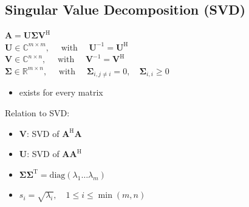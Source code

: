 \documentclass[english]{latex4ei/latex4ei_sheet}
\begin{document}
\begin{sectionbox}
  \subsection{Singular Value Decomposition (SVD)}
  \begin{emphbox}
    $\boldsymbol{A}=\boldsymbol{U} \boldsymbol{\Sigma} \boldsymbol{V}^{\mathrm{H}}$\\
    $\boldsymbol{U} \in \mathbb{C}^{m \times m}, \quad \text { with } \quad \boldsymbol{U}^{-1}=\boldsymbol{U}^{\mathrm{H}}$\\
    $\boldsymbol{V} \in \mathbb{C}^{n \times n}, \quad \text { with } \quad \boldsymbol{V}^{-1}=\boldsymbol{V}^{\mathrm{H}}$\\
    $\boldsymbol{\Sigma} \in \mathbb{R}^{m \times n}, \quad \text { with } \quad \boldsymbol{\Sigma}_{i, j \neq i}=0, \quad \boldsymbol{\Sigma}_{i, i} \geq 0$\\
  \end{emphbox}
  \begin{itemize}
    \item exists for every matrix
  \end{itemize}

  Relation to SVD:\\
  \begin{itemize}
    \item $\boldsymbol{V}$: SVD of $\boldsymbol{A}^{\mathrm{H}} \boldsymbol{A}$
    \item $\boldsymbol{U}$: SVD of $\boldsymbol{A} \boldsymbol{A}^{\mathrm{H}}$
    \item $\boldsymbol{\Sigma}\boldsymbol{\Sigma}^{\mathrm{T}} = \text{diag}(\lambda_1 \dots \lambda_m)$
    \item $s_i=\sqrt{\lambda_{i}}, \quad 1 \leq i \leq \min (m, n)$
  \end{itemize}


\end{sectionbox}
\end{document}
